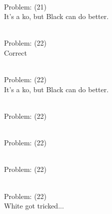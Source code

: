 \documentclass[11pt]{article}
\begin{document}
\begin{minipage}[t]{0.5\textwidth}
  {\centering
  
\\
Problem: (21)\\
It's a ko, but Black can do better.\\
  }
\end{minipage}
\begin{minipage}[t]{0.5\textwidth}
  {\centering
  
\\
Problem: (22)\\
Correct\\
  }
\end{minipage}
\begin{minipage}[t]{0.5\textwidth}
  {\centering
  
\\
Problem: (22)\\
It's a ko, but Black can do better.\\
  }
\end{minipage}
\begin{minipage}[t]{0.5\textwidth}
  {\centering
  
\\
Problem: (22)\\
  }
\end{minipage}
\begin{minipage}[t]{0.5\textwidth}
  {\centering
  
\\
Problem: (22)\\
  }
\end{minipage}
\begin{minipage}[t]{0.5\textwidth}
  {\centering
  
\\
Problem: (22)\\
  }
\end{minipage}
\begin{minipage}[t]{0.5\textwidth}
  {\centering
  
\\
Problem: (22)\\
White got tricked...\\
  }
\end{minipage}
\end{document}
